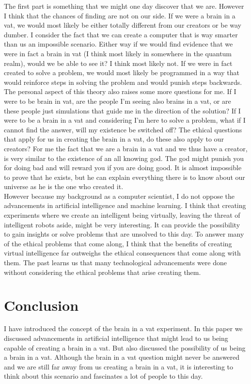 \documentclass[a4paper]{article}
\begin{document}
The first part is something that we might one day discover that we are. However I think that the chances of finding are not on our side. If we were a brain in a vat, we would most likely be either totally different from our creators or be way dumber. I consider the fact that we can create a computer that is way smarter than us an impossible scenario. Either way if we would find evidence that we were in fact a brain in vat (I think most likely in somewhere in the quantum realm), would we be able to see it? I think most likely not. If we were in fact created to solve a problem, we would most likely be programmed in a way that would reinforce steps in solving the problem and would punish steps backwards.\\
The personal aspect of this theory also raises some more questions for me. If I were to be brain in vat, are the people I'm seeing also brains in a vat, or are these people just simulations that guide me in the direction of the solution? If I were to be a brain in a vat and considering I'm here to solve a problem, what if I cannot find the answer, will my existence be switched off? The ethical questions that apply for us in creating the brain in a vat, do these also apply to our creators? For me the fact that we are a brain in a vat and we thus have a creator, is very similar to the existence of an all knowing god. The god might punish you for doing bad and will reward you if you are doing good. It is almost impossible to prove that he exists, but he can explain everything there is to know about our universe as he is the one who created it.\\

However because my background as a computer scientist, I do not oppose the advancements in artificial intelligence and machine learning. I think that creating experiments where we create an intelligent being virtually, leaving the threat of intelligent robots aside, might be very interesting. It can provide the possibility to gain insights or solve problems that are unsolved to this day. To answer many of the ethical problems that come along, I think that the benefits of creating virtual intelligence far outweighs the ethical consequences that come along with them. The past learns us that many technological advancements were done without considering the ethical problems that arise creating them.

\section{Conclusion}
I have introduced the concept of the brain in a vat experiment. In this paper we discussed advancements in artificial intelligence that might lead to us being capable of creating a brain in a vat. But also discussed the possibility of us being a brain in a vat. Although the brain in a vat question might never be answered and we are still far away from us creating a brain in a vat, it is interesting to think about this scenario and fascinates a lot of people to this day.
\end{document}
